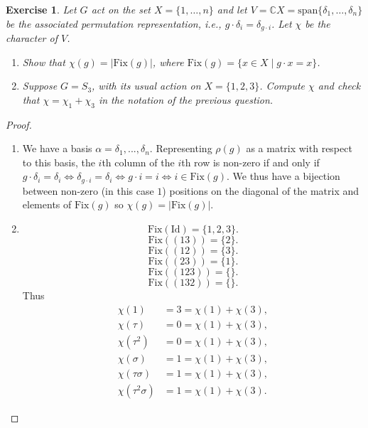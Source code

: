 \documentclass{article}
\newtheorem{exercise}[theorem]{Exercise}
\begin{document}
\begin{exercise}
    Let \( G \) act on the set \( X = \{1, \dots, n\} \) and let \( V = \mathbb{C}X = \text{span}\{\delta_1, \dots, \delta_n\} \) be the associated permutation representation, i.e., \( g \cdot \delta_i = \delta_{g \cdot i} \). Let \(\chi\) be the character of \( V \).
    \begin{enumerate}
        \item Show that \(\chi(g) = |\text{Fix}(g)|\), where \(\text{Fix}(g) = \{x \in X \mid g \cdot x = x\}\).
        \item Suppose \( G = S_3 \), with its usual action on \( X = \{1, 2, 3\} \). Compute \(\chi\) and check that \( \chi = \chi_1 + \chi_3 \) in the notation of the previous question.
    \end{enumerate}
\end{exercise}
\begin{proof}
\begin{enumerate}
    \item We have a basis $\alpha=\delta_1,...,\delta_n$. Representing $\rho(g)$ as a matrix with respect to this basis, the $i$th column of the $i$th row is non-zero if and only if $g\cdot\delta_i=\delta_i\iff\delta_{g\cdot i}=\delta_i\iff g\cdot i=i\iff i\in\text{Fix}(g)$. We thus have a bijection between non-zero (in this case $1$) positions on the diagonal of the matrix and elements of $\text{Fix}(g)$ so $\chi(g)=|\text{Fix}(g)|$.
    \item \[\text{Fix}(\text{Id})=\{1,2,3\}.\]\[\text{Fix}((13))=\{2\}.\]\[\text{Fix}((12))=\{3\}.\]\[\text{Fix}((23))=\{1\}.\]\[\text{Fix}((123))=\{\}.\]\[\text{Fix}((132))=\{\}.\]Thus \begin{align*}
        \chi(1)&=3=\chi(1)+\chi(3),\\
        \chi(\tau)&=0=\chi(1)+\chi(3),\\
        \chi(\tau^2)&=0=\chi(1)+\chi(3),\\
        \chi(\sigma)&=1=\chi(1)+\chi(3),\\
        \chi(\tau\sigma)&=1=\chi(1)+\chi(3),\\
        \chi(\tau^2\sigma)&=1=\chi(1)+\chi(3).
    \end{align*}
\end{enumerate}
\end{proof}
\end{document}
